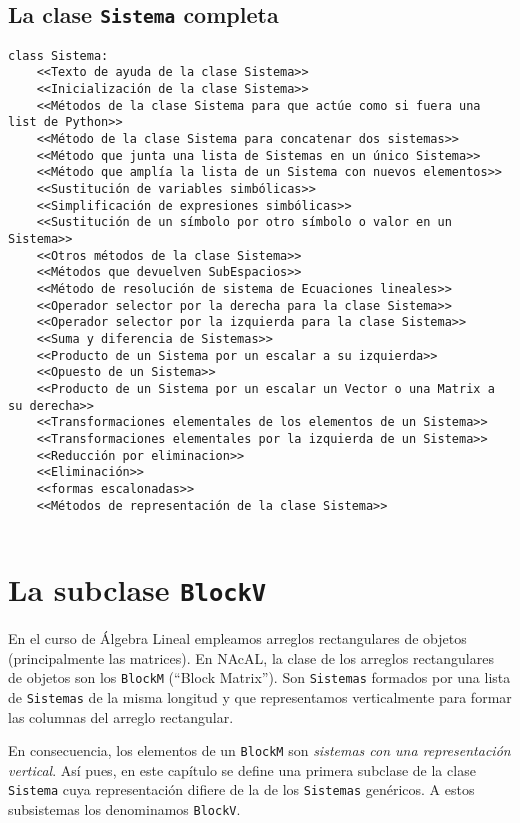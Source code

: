 \documentclass[11pt]{report}
\begin{document}
\clearpage

\section{La clase \texttt{Sistema} completa}
\label{sec:orga164c31}

\begin{verbatim}
class Sistema:
    <<Texto de ayuda de la clase Sistema>>
    <<Inicialización de la clase Sistema>>
    <<Métodos de la clase Sistema para que actúe como si fuera una list de Python>>
    <<Método de la clase Sistema para concatenar dos sistemas>>
    <<Método que junta una lista de Sistemas en un único Sistema>>
    <<Método que amplía la lista de un Sistema con nuevos elementos>>
    <<Sustitución de variables simbólicas>>
    <<Simplificación de expresiones simbólicas>>
    <<Sustitución de un símbolo por otro símbolo o valor en un Sistema>>
    <<Otros métodos de la clase Sistema>>
    <<Métodos que devuelven SubEspacios>>
    <<Método de resolución de sistema de Ecuaciones lineales>>
    <<Operador selector por la derecha para la clase Sistema>>
    <<Operador selector por la izquierda para la clase Sistema>>
    <<Suma y diferencia de Sistemas>>
    <<Producto de un Sistema por un escalar a su izquierda>>
    <<Opuesto de un Sistema>>
    <<Producto de un Sistema por un escalar un Vector o una Matrix a su derecha>>
    <<Transformaciones elementales de los elementos de un Sistema>>
    <<Transformaciones elementales por la izquierda de un Sistema>>
    <<Reducción por eliminacion>>
    <<Eliminación>>
    <<formas escalonadas>>
    <<Métodos de representación de la clase Sistema>>
    
\end{verbatim}


\chapter{La subclase \texttt{BlockV}}
\label{sec:org1dd773e}

En el curso de Álgebra Lineal empleamos arreglos rectangulares de
objetos (principalmente las matrices). En NAcAL, la clase de los
arreglos rectangulares de objetos son los \texttt{BlockM} (``Block
Matrix''). Son \texttt{Sistemas} formados por una lista de \texttt{Sistemas} de la
misma longitud y que representamos verticalmente para formar las
columnas del arreglo rectangular.

En consecuencia, los elementos de un \texttt{BlockM} son \emph{sistemas con una
representación vertical}. Así pues, en este capítulo se define una
primera subclase de la clase \texttt{Sistema} cuya representación difiere de
la de los \texttt{Sistemas} genéricos. A estos subsistemas los denominamos
\texttt{BlockV}.
\end{document}
